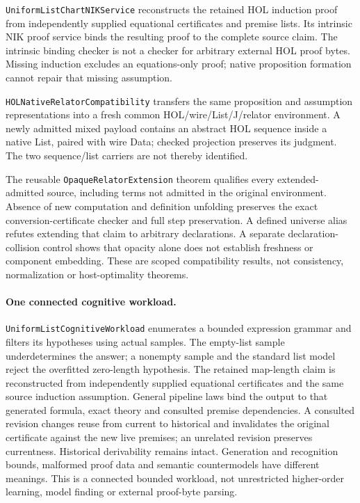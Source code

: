 \documentclass[11pt]{article}
\theoremstyle{definition}
\theoremstyle{remark}
\begin{document}
\texttt{UniformListChartNIKService} reconstructs the retained HOL induction
proof from independently supplied equational certificates and premise lists.
Its intrinsic NIK proof service binds the resulting proof to the complete
source claim. The intrinsic binding checker is not a checker for arbitrary
external HOL proof bytes. Missing induction excludes an equations-only proof;
native proposition formation cannot repair that missing assumption.

\texttt{HOLNativeRelatorCompatibility} transfers the same proposition and
assumption representations into a fresh common HOL/wire/List/J/relator
environment. A newly admitted mixed payload contains an abstract HOL sequence
inside a native List, paired with wire Data; checked projection preserves its
judgment. The two sequence/list carriers are not thereby identified.

The reusable \texttt{OpaqueRelatorExtension} theorem qualifies every
extended-admitted source, including terms not admitted in the original
environment. Absence of new computation and definition unfolding preserves
the exact conversion-certificate checker and full step preservation. A defined
universe alias refutes extending that claim to arbitrary declarations. A
separate declaration-collision control shows that opacity alone does not
establish freshness or component embedding. These are scoped compatibility
results, not consistency, normalization or host-optimality theorems.

\paragraph{One connected cognitive workload.}
\texttt{UniformListCognitiveWorkload} enumerates a bounded expression grammar
and filters its hypotheses using actual samples. The empty-list sample
underdetermines the answer; a nonempty sample and the standard list model
reject the overfitted zero-length hypothesis. The retained map-length claim
is reconstructed from independently supplied equational certificates and
the same source induction assumption. General pipeline laws bind the output
to that generated formula, exact theory and consulted premise dependencies.
A consulted revision changes reuse from current to historical and invalidates
the original certificate against the new live premises; an unrelated revision
preserves currentness. Historical derivability remains intact. Generation
and recognition bounds, malformed proof data and semantic countermodels have
different meanings. This is a connected bounded workload, not unrestricted
higher-order learning, model finding or external proof-byte parsing.
\end{document}
